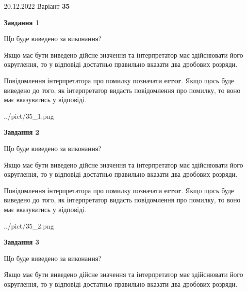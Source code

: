\documentclass[12pt, ukrainian]{article}
\begin{document}
{20.12.2022 Варіант \No \textbf { 35 }\par}
{
\begin {Large}

{\begin {center}\textbf{Завдання 1}\end {center}}\par
Що буде виведено за виконання? \par

Якщо має бути виведено дійсне значення та інтерпретатор має здійснювати його округлення, 
то у відповіді достатньо правильно вказати два дробових розряди.

Повідомлення інтерпретатора про помилку позначати \textbf{error}.
Якщо щось буде виведено до того, як інтерпретатор видасть повідомлення про помилку, 
то воно має вказуватись у відповіді. \par

\begin{center}
	{../pict/35_1.png}
\end{center}
\newpage

{\begin {center}\textbf{Завдання 2}\end {center}}\par
Що буде виведено за виконання? \par

Якщо має бути виведено дійсне значення та інтерпретатор має здійснювати його округлення, 
то у відповіді достатньо правильно вказати два дробових розряди.

Повідомлення інтерпретатора про помилку позначати \textbf{error}.
Якщо щось буде виведено до того, як інтерпретатор видасть повідомлення про помилку, 
то воно має вказуватись у відповіді. \par

\begin{center}
	{../pict/35_2.png}
\end{center}
\newpage

{\begin {center}\textbf{Завдання 3}\end {center}}\par
Що буде виведено за виконання? \par

Якщо має бути виведено дійсне значення та інтерпретатор має здійснювати його округлення, 
то у відповіді достатньо правильно вказати два дробових розряди.


\end{Large}}
\end{document}
